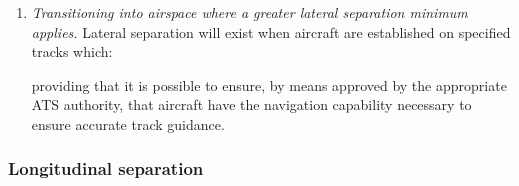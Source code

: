 \begin{enumeratesc}
\begin{enumerate}
\begin{enumerate}

            \item \textit{Transitioning into airspace where a greater lateral separation minimum applies.} Lateral separation will exist when aircraft are established on specified tracks which:

            \noindent providing that it is possible to ensure, by means approved by the appropriate ATS authority, that aircraft have the navigation capability necessary to ensure accurate track guidance.
        \end{enumerate}
    \end{enumerate}
\end{enumeratesc}

\subsubsection{Longitudinal separation}

